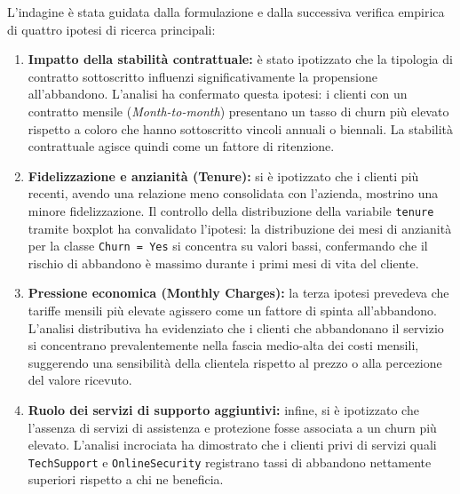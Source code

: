 \documentclass[11pt,a4paper]{article}
\begin{document}
L'indagine è stata guidata dalla formulazione e dalla successiva verifica empirica di quattro ipotesi di ricerca principali:
\begin{enumerate}
    \item \textbf{Impatto della stabilità contrattuale:} è stato ipotizzato che la tipologia di contratto sottoscritto influenzi significativamente la propensione all'abbandono. L'analisi ha confermato questa ipotesi: i clienti con un contratto mensile (\textit{Month-to-month}) presentano un tasso di churn più elevato rispetto a coloro che hanno sottoscritto vincoli annuali o biennali. La stabilità contrattuale agisce quindi come un fattore di ritenzione.
    
    \item \textbf{Fidelizzazione e anzianità (Tenure):} si è ipotizzato che i clienti più recenti, avendo una relazione meno consolidata con l'azienda, mostrino una minore fidelizzazione. Il controllo della distribuzione della variabile \texttt{tenure} tramite boxplot ha convalidato l'ipotesi: la distribuzione dei mesi di anzianità per la classe \texttt{Churn = Yes} si concentra su valori bassi, confermando che il rischio di abbandono è massimo durante i primi mesi di vita del cliente.
    
    \item \textbf{Pressione economica (Monthly Charges):} la terza ipotesi prevedeva che tariffe mensili più elevate agissero come un fattore di spinta all'abbandono. L'analisi distributiva ha evidenziato che i clienti che abbandonano il servizio si concentrano prevalentemente nella fascia medio-alta dei costi mensili, suggerendo una sensibilità della clientela rispetto al prezzo o alla percezione del valore ricevuto.
    
    \item \textbf{Ruolo dei servizi di supporto aggiuntivi:} infine, si è ipotizzato che l'assenza di servizi di assistenza e protezione fosse associata a un churn più elevato. L'analisi incrociata ha dimostrato che i clienti privi di servizi quali \texttt{TechSupport} e \texttt{OnlineSecurity} registrano tassi di abbandono nettamente superiori rispetto a chi ne beneficia.
\end{enumerate}
\end{document}
